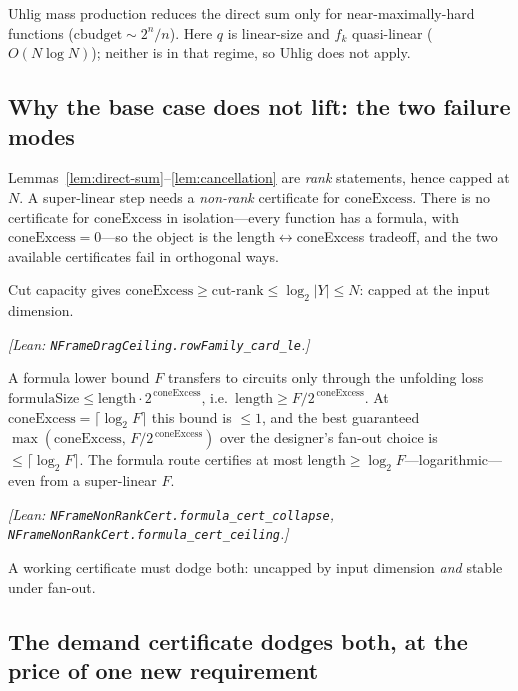 \begin{remark}
Uhlig mass production reduces the direct sum only for near-maximally-hard
functions ($\mathrm{cbudget}\sim 2^n/n$).  Here $q$ is linear-size and $f_k$
quasi-linear ($O(N\log N)$); neither is in that regime, so Uhlig does not apply.
\end{remark}

\subsection{Why the base case does not lift: the two failure modes}

Lemmas~\ref{lem:direct-sum}--\ref{lem:cancellation} are \emph{rank} statements,
hence capped at $N$.  A super-linear step needs a \emph{non-rank} certificate for
$\mathrm{coneExcess}$.  There is no certificate for $\mathrm{coneExcess}$ in
isolation---every function has a formula, with $\mathrm{coneExcess}=0$---so the
object is the length$\leftrightarrow$coneExcess tradeoff, and the two available
certificates fail in orthogonal ways.

\begin{lemma}
\label{lem:rank-cap}
Cut capacity gives $\mathrm{coneExcess}\ge \mathrm{cut\text{-}rank}\le
\log_2|Y|\le N$: capped at the input dimension.
\end{lemma}
\noindent\emph{[Lean: \texttt{NFrameDragCeiling.rowFamily\_card\_le}.]}

\begin{lemma}
\label{lem:formula-collapse}
A formula lower bound $F$ transfers to circuits only through the unfolding loss
$\mathrm{formulaSize}\le \mathrm{length}\cdot 2^{\,\mathrm{coneExcess}}$, i.e.\
$\mathrm{length}\ge F/2^{\,\mathrm{coneExcess}}$.  At
$\mathrm{coneExcess}=\lceil\log_2 F\rceil$ this bound is $\le 1$, and the best
guaranteed $\max(\mathrm{coneExcess},\,F/2^{\,\mathrm{coneExcess}})$ over the
designer's fan-out choice is $\le \lceil\log_2 F\rceil$.  The formula route
certifies at most $\mathrm{length}\ge\log_2 F$---logarithmic---even from a
super-linear $F$.
\end{lemma}
\noindent\emph{[Lean: \texttt{NFrameNonRankCert.formula\_cert\_collapse},
\texttt{NFrameNonRankCert.formula\_cert\_ceiling}.]}

A working certificate must dodge both: uncapped by input dimension \emph{and}
stable under fan-out.

\subsection{The demand certificate dodges both, at the price of one new requirement}

